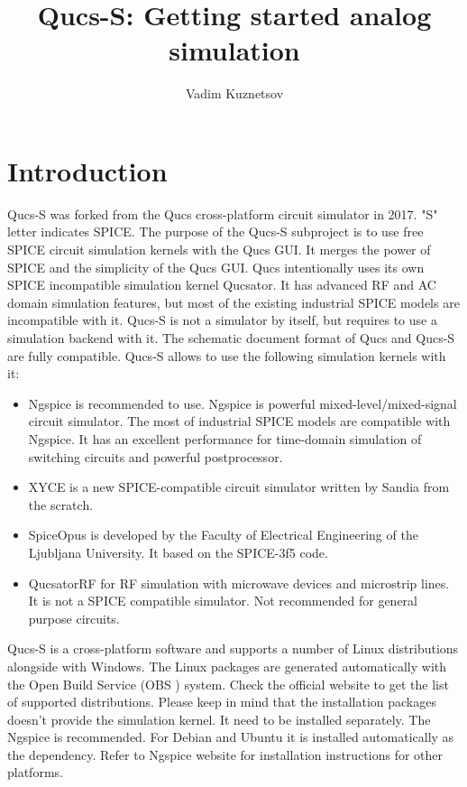 \documentclass[a4paper,12pt]{article}
\title{Qucs-S: Getting started analog simulation}
\author{Vadim Kuznetsov}
\begin{document}
\maketitle



\section{Introduction} \label{sec:intro}

Qucs-S was forked from the Qucs cross-platform circuit simulator in 2017. "S" letter indicates SPICE. The purpose of the Qucs-S subproject is to use free SPICE circuit simulation kernels with the Qucs GUI. It merges the power of SPICE and the simplicity of the Qucs GUI. Qucs intentionally uses its own SPICE incompatible simulation kernel Qucsator. It has advanced RF and AC domain simulation features, but most of the existing industrial SPICE models are incompatible with it. Qucs-S is not a simulator by itself, but requires to use a simulation backend with it. The schematic document format of Qucs and Qucs-S are fully compatible. Qucs-S allows to use the following simulation kernels with it:

\begin{itemize}
 \item  Ngspice is recommended to use. Ngspice is powerful mixed-level/mixed-signal circuit simulator. The most of industrial SPICE models are compatible with Ngspice. It has an excellent performance for time-domain simulation of switching circuits and powerful postprocessor.
 \item XYCE is a new SPICE-compatible circuit simulator written by Sandia from the scratch. 
 \item SpiceOpus is developed by the Faculty of Electrical Engineering of the Ljubljana University. It based on the SPICE-3f5 code.
 \item QucsatorRF for RF simulation with microwave devices and microstrip lines. It is not a SPICE compatible simulator. Not recommended for general purpose circuits. 
\end{itemize}

Qucs-S is a cross-platform software and supports a number of Linux distributions alongside with Windows\texttrademark. The Linux packages are generated automatically with the Open Build Service (OBS ) system. Check the official website to get the list of supported distributions. Please keep in mind that the installation packages doesn't provide the simulation kernel. It need to be installed separately. The Ngspice is recommended. For Debian and Ubuntu it is installed automatically as the dependency. Refer to Ngspice website for installation instructions for other platforms.
\end{document}

